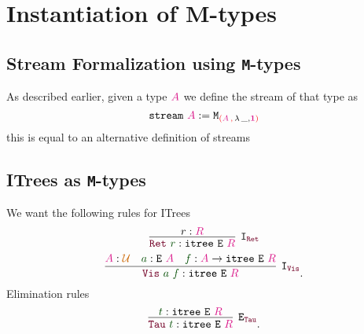 \documentclass[twoside,11pt,openright]{report}
\theoremstyle{plain} %
\theoremstyle{definition}
\theoremstyle{remark}
\newcommand*{\term}[1]{\textcolor{green!30!black}{#1}} %
\newcommand*{\type}[1]{\textcolor{magenta!90!black}{#1}}
\newcommand*{\containerpair}[2]{\textcolor{red}{(}#1\,\textcolor{red}{,}\,#2\textcolor{red}{)}}
\newcommand*{\universe}[1]{\textcolor{orange!80!black}{#1}}
\newcommand*{\unit}{\type{\textbf{1}}}
\newcommand*{\constructor}[1]{\textcolor{purple!60!black}{\ensuremath{\mathtt{#1}}}}
\newcommand*{\typeformer}[1]{\ensuremath{\mathtt{#1}}}
\begin{document}

\chapter{Instantiation of M-types}
\section{Stream Formalization using \texttt{M}-types}
As described earlier, given a type \(\type{A}\) we define the stream of that type as
\begin{equation}
  \typeformer{stream}~\type{A} := \typeformer{M}_{\containerpair{\type{A}}{\lambda\,\_,\unit}}
\end{equation}
this is equal to an alternative definition of streams 

\section{ITrees as \texttt{M}-types}
We want the following rules for ITrees
\begin{equation}
  \infer[\mathtt{I}_{\constructor{Ret}}]{\constructor{Ret}~\term{r} : \typeformer{itree}~\typeformer{E}~\type{R}}{r : \type{R}}
\end{equation}
\begin{equation}
  \infer[\mathtt{I}_{\constructor{Vis}}]{\constructor{Vis}~\term{a}~\term{f} : \typeformer{itree}~\typeformer{E}~\type{R}}{\type{A} : \universe{\mathcal{U}} & \term{a} : \typeformer{E}~\type{A} & \term{f} : \type{A} \rightarrow \typeformer{itree}~\typeformer{E}~\type{R}}.
\end{equation}
Elimination rules
\begin{equation}
  \infer[\mathtt{E}_{\constructor{Tau}}]{\constructor{Tau}~\term{t} : \typeformer{itree}~\typeformer{E}~\type{R}}{\term{t} : \typeformer{itree}~\typeformer{E}~\type{R}}.
\end{equation}
\end{document}
